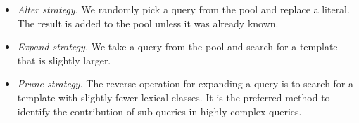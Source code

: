 \documentclass{cidr-2019}
\begin{document}

\begin{itemize}
\item{\emph{Alter strategy.\label{strategies}}}
We randomly pick a query from the pool and replace a literal.
The result is added to the pool unless it was already known.


\item{\emph{Expand strategy.}}
We take a query from the pool and search for a template
that is slightly larger.

\item{\emph{Prune strategy.}}
The reverse operation for expanding a query is to search for a template with
slightly fewer lexical classes. 
It is the preferred method to identify
the contribution of sub-queries in highly complex queries.
\end{itemize}
\end{document}
